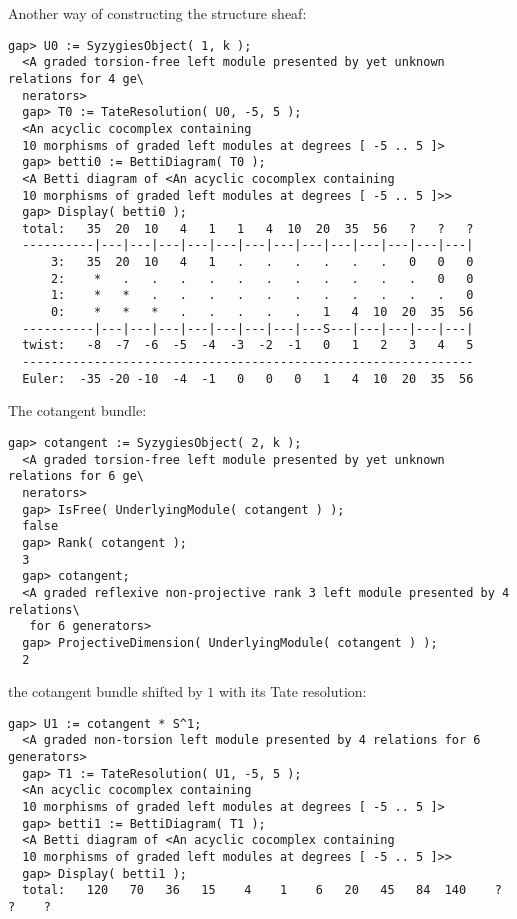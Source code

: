 \documentclass[a4paper,11pt]{report}
\begin{document}
{{{\begin{Verbatim}[fontsize=\small,frame=single,label=Example]
\end{Verbatim}
 Another way of constructing the structure sheaf: 
\begin{Verbatim}[fontsize=\small,frame=single,label=Example]
  gap> U0 := SyzygiesObject( 1, k );
  <A graded torsion-free left module presented by yet unknown relations for 4 ge\
  nerators>
  gap> T0 := TateResolution( U0, -5, 5 );
  <An acyclic cocomplex containing
  10 morphisms of graded left modules at degrees [ -5 .. 5 ]>
  gap> betti0 := BettiDiagram( T0 );
  <A Betti diagram of <An acyclic cocomplex containing 
  10 morphisms of graded left modules at degrees [ -5 .. 5 ]>>
  gap> Display( betti0 );
  total:   35  20  10   4   1   1   4  10  20  35  56   ?   ?   ?
  ----------|---|---|---|---|---|---|---|---|---|---|---|---|---|
      3:   35  20  10   4   1   .   .   .   .   .   .   0   0   0
      2:    *   .   .   .   .   .   .   .   .   .   .   .   0   0
      1:    *   *   .   .   .   .   .   .   .   .   .   .   .   0
      0:    *   *   *   .   .   .   .   .   1   4  10  20  35  56
  ----------|---|---|---|---|---|---|---|---S---|---|---|---|---|
  twist:   -8  -7  -6  -5  -4  -3  -2  -1   0   1   2   3   4   5
  ---------------------------------------------------------------
  Euler:  -35 -20 -10  -4  -1   0   0   0   1   4  10  20  35  56
\end{Verbatim}
 The cotangent bundle: 
\begin{Verbatim}[fontsize=\small,frame=single,label=Example]
  gap> cotangent := SyzygiesObject( 2, k );
  <A graded torsion-free left module presented by yet unknown relations for 6 ge\
  nerators>
  gap> IsFree( UnderlyingModule( cotangent ) );
  false
  gap> Rank( cotangent );
  3
  gap> cotangent;
  <A graded reflexive non-projective rank 3 left module presented by 4 relations\
   for 6 generators>
  gap> ProjectiveDimension( UnderlyingModule( cotangent ) );
  2
\end{Verbatim}
 the cotangent bundle shifted by $1$ with its Tate resolution: 
\begin{Verbatim}[fontsize=\small,frame=single,label=Example]
  gap> U1 := cotangent * S^1;
  <A graded non-torsion left module presented by 4 relations for 6 generators>
  gap> T1 := TateResolution( U1, -5, 5 );
  <An acyclic cocomplex containing
  10 morphisms of graded left modules at degrees [ -5 .. 5 ]>
  gap> betti1 := BettiDiagram( T1 );
  <A Betti diagram of <An acyclic cocomplex containing 
  10 morphisms of graded left modules at degrees [ -5 .. 5 ]>>
  gap> Display( betti1 );
  total:   120   70   36   15    4    1    6   20   45   84  140    ?    ?    ?

\end{Verbatim}}}}
\end{document}
